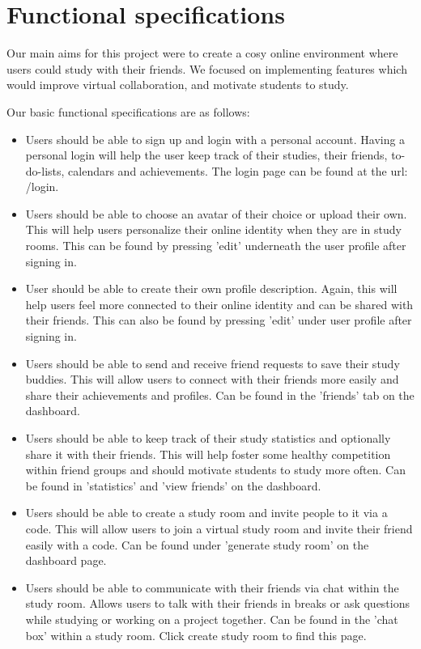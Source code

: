 \section{Functional specifications}
\label{sect:functional-specifications}

Our main aims for this project were to create a cosy online environment where users could study with their friends. We focused on implementing features which would improve virtual collaboration, and motivate students to study.

Our basic functional specifications are as follows:

\begin{itemize}
\item Users should be able to sign up and login with a personal account. Having a personal login will help the user keep track of their studies, their friends, to-do-lists, calendars and achievements. The login page can be found at the url: /login.
\item Users should be able to choose an avatar of their choice or upload their own. This will help users personalize their online identity when they are in study rooms. This can be found by pressing 'edit' underneath the user profile after signing in.
\item User should be able to create their own profile description. Again, this will help users feel more connected to their online identity and can be shared with their friends. This can also be found by pressing 'edit' under user profile after signing in.
\item Users should be able to send and receive friend requests to save their study buddies. This will allow users to connect with their friends more easily and share their achievements and profiles. Can be found in the 'friends' tab on the dashboard.
\item Users should be able to keep track of their study statistics and optionally share it with their friends. This will help foster some healthy competition within friend groups and should motivate students to study more often. Can be found in 'statistics' and 'view friends' on the dashboard.
\item Users should be able to create a study room and invite people to it via a code. This will allow users to join a virtual study room and invite their friend easily with a code. Can be found under 'generate study room' on the dashboard page.
\item Users should be able to communicate with their friends via chat within the study room. Allows users to talk with their friends in breaks or ask questions while studying or working on a project together. Can be found in the 'chat box' within a study room. Click create study room to find this page.

\end{itemize}
